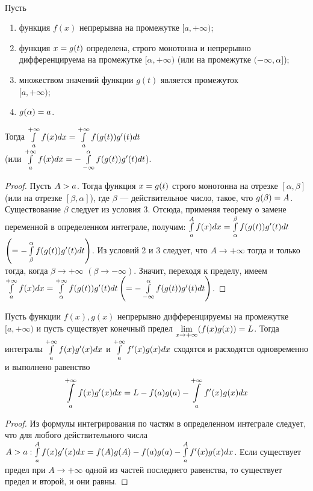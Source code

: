 \documentclass[a4paper,10pt]{article}
\begin{document}
	\begin{nthm} \label{thm1}
		\\
		Пусть
		 \begin{enumerate}[label=\arabic*)]
		 	\item функция $f(x)$ непрерывна на промежутке $[a, + \infty)$;
		 	\item функция $x \hm{=} g(t)$ определена, строго монотонна и
		 	 непрерывно дифференцируема на промежутке $[\alpha, + \infty)$ (или
		 	 на промежутке $(- \infty, \alpha]$);
		 	\item множеством значений функции $g(t)$ является промежуток \\
		 	 $[a, + \infty)$;
		 	\item $g(\alpha) \hm{=} a$.
		 \end{enumerate}
		Тогда $\intl^{+ \infty}_a f(x)dx \hm{=} \intl^{+ \infty}_a f(g(t))g'(t)dt$ \\
		 (или $\intl^{+ \infty}_a f(x)dx \hm{=} - \intl^{\alpha}_{- \infty} f(g(t))g'(t)dt$).
	\end{nthm}
	\begin{proof}
		Пусть $A \hm{>} a$. Тогда функция $x \hm{=} g(t)$ строго монотонна на отрезке $[\alpha, \beta]$
		 (или на отрезке $[\beta, \alpha]$), где $\beta$ --- действительное число, такое, что
		 $g(\beta) \hm{=} A$. Существование $\beta$ следует из условия 3. Отсюда, применяя теорему о замене переменной в определенном интеграле,
		 получим: $\intl^A_a f(x)dx \hm{=} \intl^{\beta}_{\alpha} f(g(t))g'(t)dt$ $\left( = - \mathop{\int}\limits^{\alpha}_{\beta} f(g(t))g'(t)dt\right)$. Из условий 2 и 3 следует, что $A \to + \infty$ тогда и только тогда, когда $\beta \to + \infty$
		 $(\beta \to - \infty)$.  Значит, переходя к пределу, имеем $\intl^{+ \infty}_{a}
		 f(x)dx \hm{=} \intl^{+ \infty}_{\alpha} f(g(t))g'(t)dt\left(\hm{=} - \intl^{\alpha}_{- \infty}
		 f(g(t))g'(t)dt\right)$. %
	\end{proof}
	
	\begin{nthm} \label{thm2}
		 Пусть функции $f(x), g(x)$ непрерывно дифференцируемы на
		 промежутке $[a, + \infty)$ и пусть существует конечный предел 
		 $\liml_{x \to + \infty} (f(x)g(x)) \hm{=} L$. Тогда интегралы $\mathop{\int}\limits^{+ \infty}_a f(x)g'(x)dx$ и
		 $\mathop{\int}\limits^{+ \infty}_a f'(x)g(x)dx$ сходятся и расходятся одновременно и выполнено
		 равенство
		 $$\intl^{+ \infty}_a f(x)g'(x)dx \hm{=} L - f(a)g(a)
		 - \intl^{+ \infty}_a f'(x)g(x)dx$$
	\end{nthm}
	\begin{proof}
		Из формулы интегрирования по частям в определенном интеграле
		 следует, что для любого действительного числа $A \hm{>} a: \intl^A_a f(x)g'(x)dx \hm{=} f(A)g(A) - f(a)g(a) -
		 \intl^A_a f'(x)g(x)dx$. Если существует предел при $A \to
		 + \infty$ одной из частей последнего равенства, то существует
		 предел и второй, и они равны. %
	\end{proof}
	
\end{document}

